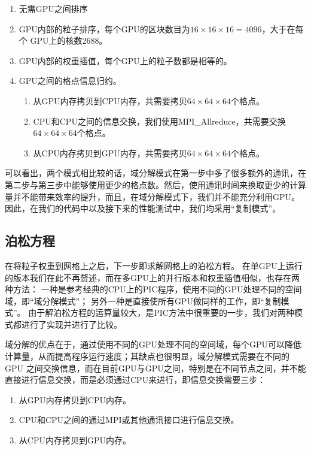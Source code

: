 \begin{enumerate}
  \item 无需GPU之间排序
  \item GPU内部的粒子排序，每个GPU的区块数目为$16 \times 16 \times 16 = 4096$，大于在每个 GPU上的核数2688。
  \item GPU内部的权重插值，每个GPU上的粒子数都是相等的。
  \item GPU之间的格点信息归约。
  \begin{enumerate}
    \item 从GPU内存拷贝到CPU内存，共需要拷贝$64 \times 64 \times 64$个格点。
    \item CPU和CPU之间的信息交换，我们使用MPI\_Allreduce，共需要交换 $64 \times 64 \times 64$个格点。
    \item 从CPU内存拷贝到GPU内存，共需要拷贝$64 \times 64 \times 64$个格点。
  \end{enumerate}
\end{enumerate}

可以看出，两个模式相比较的话，域分解模式在第一步中多了很多额外的通讯，在第二步与第三步中能够使用更少的格点数。然后，使用通讯时间来换取更少的计算量并不能带来效率的提升，而且，在域分解模式下，我们并不能充分利用GPU。因此，在我们的代码中以及接下来的性能测试中，我们均采用“复制模式”。

\subsection{泊松方程}
\label{section:PIC_GPU_Poisson}
在将粒子权重到网格上之后，下一步即求解网格上的泊松方程。
在单GPU上运行的版本我们在此不再赘述，而在多GPU上的并行版本和权重插值相似，也存在两种方法：
一种是参考经典的CPU上的PIC程序，使用不同的GPU处理不同的空间域，即“域分解模式”；
另外一种是直接使所有GPU做同样的工作，即“复制模式”。
由于解泊松方程的运算量较大，是PIC方法中很重要的一步，我们对两种模式都进行了实现并进行了比较。

域分解的优点在于，通过使用不同的GPU处理不同的空间域，每个GPU可以降低计算量，从而提高程序运行速度；其缺点也很明显，域分解模式需要在不同的GPU 之间交换信息，而在目前GPU与GPU之间，特别是在不同节点之间，并不能直接进行信息交换，而是必须通过CPU来进行，即信息交换需要三步：
\begin{enumerate}
  \item 从GPU内存拷贝到CPU内存。
  \item CPU和CPU之间的通过MPI或其他通讯接口进行信息交换。
  \item 从CPU内存拷贝到GPU内存。
\end{enumerate}

